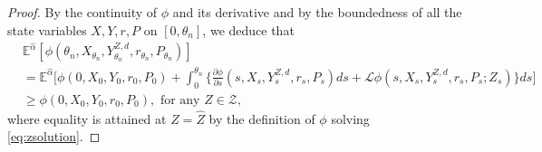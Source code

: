 \documentclass[10pt,a4paper]{amsart}
\begin{document}
\begin{proof}


By the continuity of $\phi$ and its derivative and by the boundedness of all the state variables $X,Y,r,P$ on $[0,\theta_n]$, we deduce that 
\begin{align*}
&\mathbb{E}^{\hat\alpha} [\phi(\theta_n,X_{\theta_n},Y^{Z,d}_{\theta_n}, r_{\theta_n},P_{\theta_n})]\\
&= \mathbb{E}^{\hat\alpha} \Big[\phi(0,X_0,Y_0,r_0,P_0) + \int_0^{\theta_n}  \Bigr\{ \frac{\partial \phi}{\partial s} (s, X_s, Y^{Z,d}_s,r_s,P_s) ds  +\mathcal L\phi (s, X_s, Y^{Z,d}_s, r_s, P_s; Z_s) \Bigr\} ds \Big] \\
&\geq \phi(0,X_0,Y_0,r_0,P_0), \text{ for any } Z\in \mathcal Z,\end{align*} where equality is attained at $Z=\hat Z$ by the definition of $\phi$ solving \eqref{eq:zsolution}.


\end{proof}
\end{document}

